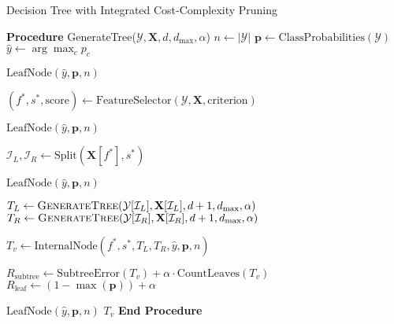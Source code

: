 \begin{algorithm}
\caption{Decision Tree with Integrated Cost-Complexity Pruning}
\label{alg:custom-tree}
\begin{algorithmic}[1]
\STATE \textbf{Procedure} GenerateTree($\mathcal{Y}, \mathbf{X}, d, d_{\max}, \alpha$)
    \STATE $n \gets |\mathcal{Y}|$
    \STATE $\mathbf{p} \gets \text{ClassProbabilities}(\mathcal{Y})$
    \STATE $\hat{y} \gets \arg\max_c p_c$
    
        \RETURN $\text{LeafNode}(\hat{y}, \mathbf{p}, n)$
    \ENDIF
    
    \STATE $(f^*, s^*, \text{score}) \gets \text{FeatureSelector}(\mathcal{Y}, \mathbf{X}, \text{criterion})$
    
        \RETURN $\text{LeafNode}(\hat{y}, \mathbf{p}, n)$
    \ENDIF
    
    \STATE $\mathcal{I}_L, \mathcal{I}_R \gets \text{Split}(\mathbf{X}[f^*], s^*)$
    
        \RETURN $\text{LeafNode}(\hat{y}, \mathbf{p}, n)$
    \ENDIF
    
    \STATE $T_L \gets \textsc{GenerateTree}(\mathcal{Y}[\mathcal{I}_L], \mathbf{X}[\mathcal{I}_L], d+1, d_{\max}, \alpha)$
    \STATE $T_R \gets \textsc{GenerateTree}(\mathcal{Y}[\mathcal{I}_R], \mathbf{X}[\mathcal{I}_R], d+1, d_{\max}, \alpha)$
    
    \STATE $T_v \gets \text{InternalNode}(f^*, s^*, T_L, T_R, \hat{y}, \mathbf{p}, n)$
    
    \STATE {}
    \STATE $R_{\text{subtree}} \gets \text{SubtreeError}(T_v) + \alpha \cdot \text{CountLeaves}(T_v)$
    \STATE $R_{\text{leaf}} \gets (1 - \max(\mathbf{p})) + \alpha$
    
        \RETURN $\text{LeafNode}(\hat{y}, \mathbf{p}, n)$ 
    \ELSE
        \RETURN $T_v$
    \ENDIF
\STATE \textbf{End Procedure}
\end{algorithmic}
\end{algorithm}


